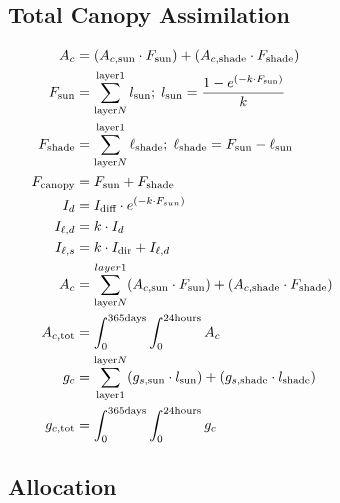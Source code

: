 \documentclass[24pt]{report}
\begin{document}
\subsection*{Total Canopy Assimilation}
\begin{align}
 A_c &= (A_{c,\text{sun}}\cdot F_{\text{sun}}) + (A_{c,\text{shade}} \cdot F_{\text{shade}}) \label{eqn:Ac} \\
 F_{\text{sun}} &= \sum_{\text{layer} N}^{\text{layer} 1} l_{\text{sun}} ; \;  l_{\text{sun}} = \frac{1-e^{(-k\cdot F_{\text{sun}})}}{k} \label{eqn:Fsun2} \\
 F_{\text{shade}} &= \sum_{\text{layer} N}^{\text{layer} 1} \ell_{\text{shade}}; \; \ell_{\text{shade}}=F_{\text{sun}}-\ell_{\text{sun}} \label{eqn:Fshade2} \\
 F_{\text{canopy}} &= F_{\text{sun}} + F_{\text{shade}} \hspace{3.1in} \label{eqn:Fcanopy2}\\
 I_{d} &= I_{\text{diff}} \cdot e^{(-k\cdot F_{sun})} \label{eqn:Id} \\
 I_{\ell,d} &= k \cdot I_{d} \label{eqn:Ielld} \\
 I_{\ell,s} &= k \cdot I_{\text{dir}} + I_{\ell,d} \label{eqn:Iells} \\
 A_c &= \sum_{\text{layer} N}^{layer 1} (A_{c,\text{sun}} \cdot F_{\text{sun}}) + (A_{c,\text{shade}} \cdot F_{\text{shade}}) \label{eqn:Ac2} \\
 A_{c,\text{tot}} &= \int_0^{365\text{days}}\int_{0}^{24\text{hours}} A_c \label{eqn:Actot} \\
 g_c &= \sum_{\text{layer} 1}^{\text{layer} N}(g_{s,\text{sun}}\cdot l_{\text{sun}}) + (g_{s,\text{shade}}\cdot l_{\text{shade}}) \label{eqn:gc}\\ 
 g_{c,\text{tot}} &= \int_0^{365\text{days}}\int_{0}^{24\text{hours}}g_c \label{eqn:gctot} 
\end{align}

\subsection*{Allocation}
\end{document}
